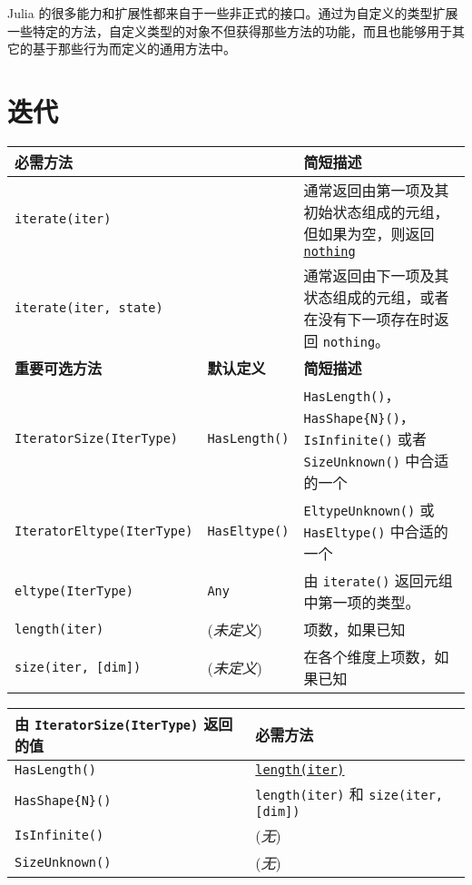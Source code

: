 Julia 的很多能力和扩展性都来自于一些非正式的接口。通过为自定义的类型扩展一些特定的方法，自定义类型的对象不但获得那些方法的功能，而且也能够用于其它的基于那些行为而定义的通用方法中。



\hypertarget{5510379658285713272}{}


\section{迭代}




\begin{table}[h]

\begin{tabulary}{\linewidth}{|L|L|L|}
\hline
必需方法 &  & 简短描述 \\
\hline
\texttt{iterate(iter)} &  & 通常返回由第一项及其初始状态组成的元组，但如果为空，则返回 \hyperlink{9331422207248206047}{\texttt{nothing}} \\
\hline
\texttt{iterate(iter, state)} &  & 通常返回由下一项及其状态组成的元组，或者在没有下一项存在时返回 \texttt{nothing}。 \\
\hline
\textbf{重要可选方法} & \textbf{默认定义} & \textbf{简短描述} \\
\hline
\texttt{IteratorSize(IterType)} & \texttt{HasLength()} & \texttt{HasLength()}，\texttt{HasShape\{N\}()}，\texttt{IsInfinite()} 或者 \texttt{SizeUnknown()} 中合适的一个 \\
\hline
\texttt{IteratorEltype(IterType)} & \texttt{HasEltype()} & \texttt{EltypeUnknown()} 或 \texttt{HasEltype()} 中合适的一个 \\
\hline
\texttt{eltype(IterType)} & \texttt{Any} & 由 \texttt{iterate()} 返回元组中第一项的类型。 \\
\hline
\texttt{length(iter)} & (\emph{未定义}) & 项数，如果已知 \\
\hline
\texttt{size(iter, [dim])} & (\emph{未定义}) & 在各个维度上项数，如果已知 \\
\hline
\end{tabulary}

\end{table}




\begin{table}[h]

\begin{tabulary}{\linewidth}{|L|L|}
\hline
由 \texttt{IteratorSize(IterType)} 返回的值 & 必需方法 \\
\hline
\texttt{HasLength()} & \hyperlink{3699181304419743826}{\texttt{length(iter)}} \\
\hline
\texttt{HasShape\{N\}()} & \texttt{length(iter)} 和 \texttt{size(iter, [dim])} \\
\hline
\texttt{IsInfinite()} & (\emph{无}) \\
\hline
\texttt{SizeUnknown()} & (\emph{无}) \\
\hline
\end{tabulary}

\end{table}




